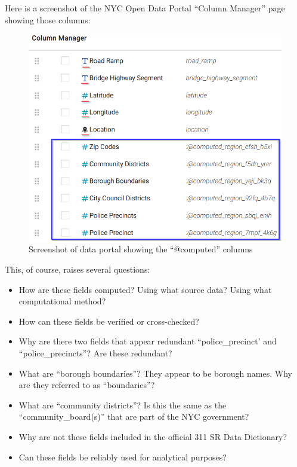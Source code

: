 \documentclass[12pt, titlepage]{article}
\begin{document}
Here is a screenshot of the NYC Open Data Portal ``Column Manager'' page showing those columns:

\begin{figure}[H]
  \centering
	  \includegraphics[width = \textwidth] {computed_columns_screenshot.png}
	  \caption{Screenshot of data portal showing the ``@computed'' columns}
	  \label{fig:computed-columns}
\end{figure}

This, of course, raises several questions:

\begin{itemize}
	\item How are these fields computed? Using what source data? Using what computational method?
	\item How can these fields be verified or cross-checked?
	\item Why are there two fields that appear redundant ``police\_precinct' and ``police\_precincts''? Are these redundant?
	\item What are ``borough boundaries''? They appear to be borough names. Why are they referred to as ``boundaries''?
	\item What are ``community districts''? Is this the same as the ``community\_board(s)'' that are part of the NYC government?
	\item Why are not these fields included in the official 311 SR Data Dictionary?
	\item Can these fields be reliably used for analytical purposes? 
\end{itemize}	
\end{document}

